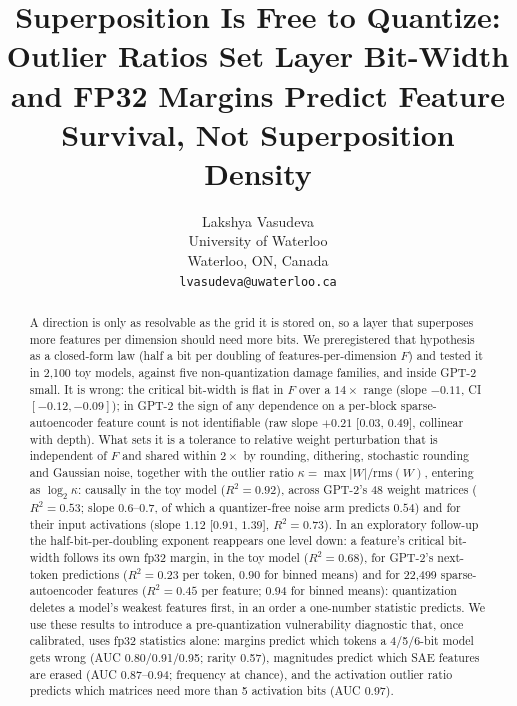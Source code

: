 \documentclass{article}
\title{Superposition Is Free to Quantize: Outlier Ratios Set Layer Bit-Width and FP32 Margins Predict Feature Survival, Not Superposition Density}
\author{Lakshya Vasudeva \\ University of Waterloo \\ Waterloo, ON, Canada \\ \texttt{lvasudeva@uwaterloo.ca}}
\begin{document}
\maketitle

\begin{abstract}
A direction is only as resolvable as the grid it is stored on, so a layer that superposes more features per dimension
should need more bits. We preregistered
that hypothesis as a closed-form law (half a bit per doubling of features-per-dimension $F$) and tested it in 2{,}100
toy models, against five non-quantization damage families, and inside GPT-2 small. It is wrong:
the critical bit-width is flat in $F$ over a $14\times$ range (slope $-0.11$, CI $[-0.12,-0.09]$); in GPT-2 the sign of any dependence on a per-block sparse-autoencoder feature count is not identifiable (raw slope
$+0.21$ [$0.03$, $0.49$], collinear with depth). What sets it is a
tolerance to relative weight perturbation that is independent of $F$ and shared within $2\times$ by rounding, dithering,
stochastic rounding and Gaussian noise, together with the outlier ratio $\kappa=\max|W|/\mathrm{rms}(W)$, entering as
$\log_2\kappa$: causally in the toy model ($R^2=0.92$), across GPT-2's 48 weight matrices ($R^2=0.53$; slope $0.6$--$0.7$, of
which a quantizer-free noise arm predicts $0.54$) and for their input activations (slope $1.12$ [$0.91$, $1.39$], $R^2=0.73$). In an exploratory follow-up the half-bit-per-doubling exponent reappears one level down: a feature's critical
bit-width follows its own fp32 margin, in the toy model ($R^2=0.68$), for GPT-2's next-token predictions ($R^2=0.23$ per token, $0.90$ for binned means) and for 22{,}499 sparse-autoencoder features ($R^2=0.45$ per feature;
$0.94$ for binned means):
quantization deletes a model's weakest features first, in an order a one-number statistic predicts. We use these results to introduce a pre-quantization vulnerability diagnostic that,
once calibrated, uses fp32 statistics alone: margins predict which tokens a 4/5/6-bit model gets wrong (AUC 0.80/0.91/0.95; rarity 0.57), magnitudes predict which
SAE features are erased (AUC 0.87--0.94; frequency at chance), and the activation outlier ratio predicts which matrices need more
than 5 activation bits (AUC 0.97).
\end{abstract}
\end{document}
